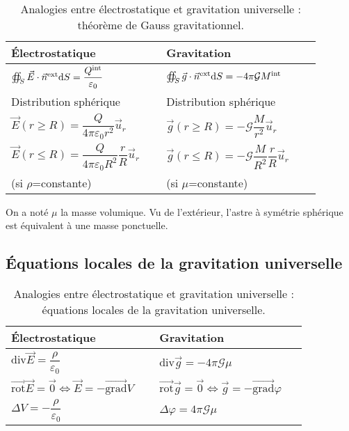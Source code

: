     \begin{table}
        \centering
        \begin{tabular}{p{0.45\linewidth}|p{0.45\linewidth}}
            \toprule
            Électrostatique & Gravitation \\ \midrule
            $\oiint_{S}\vec{E}\cdot\vec{n}^{\text{ext}}\mathrm{d} S=\dfrac{Q^{\text{int}}}{\varepsilon_0}$ & $\oiint_{S}\vec{g}\cdot\vec{n}^{\text{ext}}\mathrm{d} S=-4\pi\mathcal{G}M^{\text{int}}$\\ \midrule
            Distribution sphérique & Distribution sphérique \\ \midrule
            $\vec{E}(r\geqslant R)=\dfrac{Q}{4\pi\varepsilon_0 r^{2}}\vec{u}_r$ & $\vec{g}(r\geqslant R)=-\mathcal{G}\dfrac{M}{r^{2}}\vec{u}_r$\\
            $\vec{E}(r\leqslant R)=\dfrac{Q}{4\pi\varepsilon_0 R^{2}}\dfrac{r}{R}\vec{u}_r$ &
            $\vec{g}(r\leqslant R)=-\mathcal{G}\dfrac{M}{R^{2}}\dfrac{r}{R}\vec{u}_r$\\
            (si $\rho$=constante)&(si $\mu$=constante)
            \\ \bottomrule
        \end{tabular}    
        \caption[Théorème de Gauss gravitationnel]{Analogies entre électrostatique et gravitation universelle : théorème de Gauss gravitationnel.}
        \label{tab:analogie_gravitation_universelle_theoreme_gauss_gravitationnel}
    \end{table}

    On a noté $\mu$ la masse volumique. Vu de l'extérieur, l'astre à symétrie sphérique est équivalent à une masse ponctuelle.

    \subsection{Équations locales de la gravitation universelle}

    \begin{table}
        \centering
        \begin{tabular}{p{0.45\linewidth}|p{0.45\linewidth}}
            \toprule
            Électrostatique & Gravitation \\ \midrule
            $\mathrm{div}\vec{E}=\dfrac{\rho}{\varepsilon_0}$ & $\mathrm{div}\vec{g}=-4\pi\mathcal{G}\mu$ \\ \midrule
            $\vec{\mathrm{rot}}\vec{E}=\vec{0}\Leftrightarrow\vec{E}=-\vec{\mathrm{grad}}V$ & $\vec{\mathrm{rot}}\vec{g}=\vec{0}\Leftrightarrow\vec{g}=-\vec{\mathrm{grad}}\varphi$\\ \midrule
            $\Delta V=-\dfrac{\rho}{\varepsilon_0}$ & $\Delta \varphi=4\pi\mathcal{G}\mu$
            \\ \bottomrule
        \end{tabular}    
        \caption[Équations locales de la gravitation universelle]{Analogies entre électrostatique et gravitation universelle : équations locales de la gravitation universelle.}
        \label{tab:analogie_gravitation_universelle_equations_locales_gravitation_universelle}
    \end{table}


